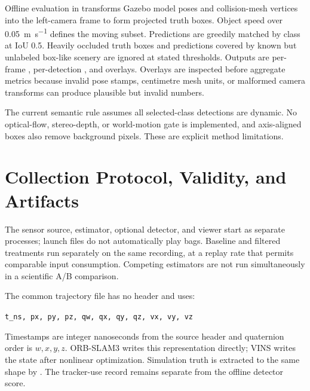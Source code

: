 Offline evaluation in  transforms Gazebo model poses and
collision-mesh vertices into the left-camera frame to form projected truth boxes.
Object speed over \SI{0.05}{\metre\per\second} defines the moving subset.
Predictions are greedily matched by class at IoU 0.5. Heavily occluded truth boxes
and predictions covered by known but unlabeled box-like scenery are ignored at
stated thresholds. Outputs are per-frame , per-detection
, and overlays. Overlays are inspected before aggregate
metrics because invalid pose stamps, centimetre mesh units, or malformed camera
transforms can produce plausible but invalid numbers.

The current semantic rule assumes all selected-class detections are dynamic. No
optical-flow, stereo-depth, or world-motion gate is implemented, and axis-aligned
boxes also remove background pixels. These are explicit method limitations.

\section{Collection Protocol, Validity, and Artifacts}
\label{sec:collection-validity}

The sensor source, estimator, optional detector, and viewer start as separate
processes; launch files do not automatically play bags. Baseline and filtered
treatments run separately on the same recording, at a replay rate that permits
comparable input consumption. Competing estimators are not run simultaneously in
a scientific A/B comparison.

The common trajectory file has no header and uses:
\begin{center}
\texttt{t\_ns, px, py, pz, qw, qx, qy, qz, vx, vy, vz}
\end{center}
Timestamps are integer nanoseconds from the source header and quaternion order is
$w,x,y,z$. ORB-SLAM3 writes this representation directly; VINS writes the state
after nonlinear optimization. Simulation truth is extracted to the same shape by
. The tracker-use record  remains
separate from the offline detector score.

